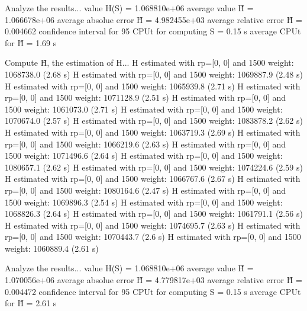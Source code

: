 Analyze the results...
  value H(S)                  = 1.068810e+06 
  average value H̃             = 1.066678e+06 
  average absolue error H̃     = 4.982455e+03 
  average relative error H̃    = 0.004662 
  confidence interval for 95%
  CPUt for computing S         = 0.15 s
  average CPUt for H̃           = 1.69 s

Compute H̃, the estimation of H...
  H estimated with rp=[0, 0] and 1500 weight:  1068738.0  (2.68 s)
  H estimated with rp=[0, 0] and 1500 weight:  1069887.9  (2.48 s)
  H estimated with rp=[0, 0] and 1500 weight:  1065939.8  (2.71 s)
  H estimated with rp=[0, 0] and 1500 weight:  1071128.9  (2.51 s)
  H estimated with rp=[0, 0] and 1500 weight:  1061073.0  (2.71 s)
  H estimated with rp=[0, 0] and 1500 weight:  1070674.0  (2.57 s)
  H estimated with rp=[0, 0] and 1500 weight:  1083878.2  (2.62 s)
  H estimated with rp=[0, 0] and 1500 weight:  1063719.3  (2.69 s)
  H estimated with rp=[0, 0] and 1500 weight:  1066219.6  (2.63 s)
  H estimated with rp=[0, 0] and 1500 weight:  1071496.6  (2.64 s)
  H estimated with rp=[0, 0] and 1500 weight:  1080657.1  (2.62 s)
  H estimated with rp=[0, 0] and 1500 weight:  1074224.6  (2.59 s)
  H estimated with rp=[0, 0] and 1500 weight:  1066767.6  (2.67 s)
  H estimated with rp=[0, 0] and 1500 weight:  1080164.6  (2.47 s)
  H estimated with rp=[0, 0] and 1500 weight:  1069896.3  (2.54 s)
  H estimated with rp=[0, 0] and 1500 weight:  1068826.3  (2.64 s)
  H estimated with rp=[0, 0] and 1500 weight:  1061791.1  (2.56 s)
  H estimated with rp=[0, 0] and 1500 weight:  1074695.7  (2.63 s)
  H estimated with rp=[0, 0] and 1500 weight:  1070443.7  (2.6 s)
  H estimated with rp=[0, 0] and 1500 weight:  1060889.4  (2.61 s)

Analyze the results...
  value H(S)                  = 1.068810e+06 
  average value H̃             = 1.070056e+06 
  average absolue error H̃     = 4.779817e+03 
  average relative error H̃    = 0.004472 
  confidence interval for 95%
  CPUt for computing S         = 0.15 s
  average CPUt for H̃           = 2.61 s

